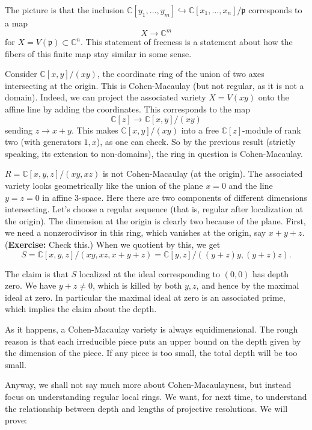 The picture is that the inclusion $\mathbb{C}[y_1, \dots, y_m ]
\hookrightarrow
\mathbb{C}[x_1, \dots, x_n]/\mathfrak{p}$ corresponds to a map
\[ X \to \mathbb{C}^m  \]
for $X = V(\mathfrak{p}) \subset \mathbb{C}^n$. This statement
of freeness is a
statement about how the fibers of this finite map stay similar
in some sense.

\begin{example}
Consider $\mathbb{C}[x,y]/(xy)$, the coordinate ring of the
union of two axes
intersecting at the origin. This is Cohen-Macaulay (but not
regular, as it
is not a domain). Indeed, we can project the associated variety
$X = V(xy)$
onto the affine line by adding the coordinates. This corresponds
to the map
\[ \mathbb{C}[z] \to \mathbb{C}[x,y]/(xy)  \]
sending $z \to x+y$. This makes $\mathbb{C}[x,y]/(xy)$ into a
free
$\mathbb{C}[z]$-module of rank two (with generators $1, x$), as
one can check.
So by the previous result (strictly speaking, its extension to
non-domains),
the ring in question is Cohen-Macaulay.
\end{example}

\begin{example}
$R=\mathbb{C}[x,y,z]/(xy, xz)$ is not Cohen-Macaulay (at the
origin). The associated variety looks
geometrically like the union of the plane $x=0$ and the line
$y=z=0$ in affine
3-space. Here there are two components of different dimensions
intersecting.
Let's choose a regular sequence (that is, regular after
localization at the
origin). The dimension at the origin is clearly two because of
the plane.
First, we need a nonzerodivisor in this ring, which vanishes at
the origin, say
$ x+y+z$. (\textbf{Exercise:} Check this.) When we quotient by
this, we get
\[ S=\mathbb{C}[x,y,z]/(xy,xz, x+y+z) = \mathbb{C}[y,z]/(
(y+z)y, (y+z)z). \]

The claim is that $S$ localized at the ideal corresponding to
$(0,0)$ has depth
zero. We have $y+z \neq 0$, which is killed by both $y,z$, and
hence by the
maximal ideal at zero. In particular the maximal ideal at zero
is an associated
prime, which implies the claim about the depth.
\end{example}

As it happens, a Cohen-Macaulay variety is always
equidimensional. The rough
reason is that each irreducible piece puts an upper bound on the
depth given by
the dimension of the piece. If any piece is too small, the total
depth will be
too small.

Anyway, we shall not say much more about Cohen-Macaulayness, but
instead focus
on understanding regular local rings. We want, for next time,
to understand the relationship
between depth and lengths of projective resolutions.
We will prove:

